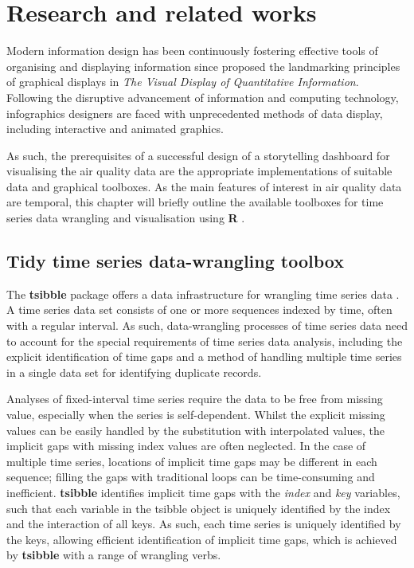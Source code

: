 \documentclass{aucklandthesis}
\begin{document}
\hypertarget{ch:lit-review}{%
\chapter{Research and related works}\label{ch:lit-review}}

Modern information design has been continuously fostering effective tools of organising and displaying information since \textcite{tufte} proposed the landmarking principles of graphical displays in \emph{The Visual Display of Quantitative Information}. Following the disruptive advancement of information and computing technology, infographics designers are faced with unprecedented methods of data display, including interactive and animated graphics.

As such, the prerequisites of a successful design of a storytelling dashboard for visualising the air quality data are the appropriate implementations of suitable data and graphical toolboxes. As the main features of interest in air quality data are temporal, this chapter will briefly outline the available toolboxes for time series data wrangling and visualisation using \textbf{R} \autocite{R2021}.

\hypertarget{tidy-time-series-data-wrangling-toolbox}{%
\section{Tidy time series data-wrangling toolbox}\label{tidy-time-series-data-wrangling-toolbox}}

The \textbf{tsibble} package offers a data infrastructure for wrangling time series data \autocite{tsibble}. A time series data set consists of one or more sequences indexed by time, often with a regular interval. As such, data-wrangling processes of time series data need to account for the special requirements of time series data analysis, including the explicit identification of time gaps and a method of handling multiple time series in a single data set for identifying duplicate records.

Analyses of fixed-interval time series require the data to be free from missing value, especially when the series is self-dependent. Whilst the explicit missing values can be easily handled by the substitution with interpolated values, the implicit gaps with missing index values are often neglected. In the case of multiple time series, locations of implicit time gaps may be different in each sequence; filling the gaps with traditional loops can be time-consuming and inefficient. \textbf{tsibble} identifies implicit time gaps with the \emph{index} and \emph{key} variables, such that each variable in the tsibble object is uniquely identified by the index and the interaction of all keys. As such, each time series is uniquely identified by the keys, allowing efficient identification of implicit time gaps, which is achieved by \textbf{tsibble} with a range of wrangling verbs.
\end{document}
